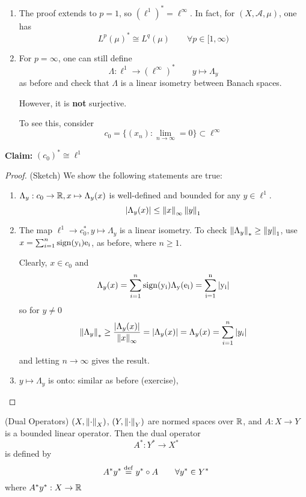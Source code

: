 \documentclass{article}
\begin{document}
\begin{remark}
    \begin{enumerate}[1)]
        \item The proof extends to $p=1$, so $(\ell^1)^* = \ell^{\infty}$. In fact, for $(X, \mathcal{A}, \mu)$, one has  
        $$L^p(\mu)^* \cong L^q(\mu) \qquad \forall p \in [1, \infty)$$
        \item For $p=\infty$, one can still define  
        $$\Lambda: \ell^1 \to (\ell^{\infty})^* \qquad y \mapsto \Lambda_y$$
        as before and check that $\Lambda$ is a linear isometry between Banach spaces.
        
        However, it is \textbf{not} surjective.  
        
        To see this, consider 
        $$c_0 = \{(x_n): \lim_{n \to \infty} = 0\} \subset \ell^{\infty}$$
    \end{enumerate}

\textbf{Claim:} \((c_0)^* \cong \ell^1\ \)
\begin{proof}
    (Sketch) We show the following statements are true:
    \begin{enumerate}[1)]
        \item \(\Lambda_y: c_0 \to \mathbb{R}, x \mapsto \Lambda_y(x)\) is well-defined and bounded for any 
        $y \in \ell^1$.  
        \[|\Lambda_y(x)| \leq \left\|{x}\right\|_{\infty} \left\|{y}\right\|_1\]

        \item The map \( \ell^1 \to c_0^*, y \mapsto \Lambda_y\) is a linear isometry. To check 
        \(\left\|{\Lambda_y}\right\|_* \geq \left\|{y}\right\|_1\), use \(x = \sum_{i=1}^n \rm{sign}(y_i)e_i\), as before, where
        \(n \geq 1\).  

        Clearly, \(x \in c_0\) and  
        \[\Lambda_y(x) = \sum_{i=1}^n \rm{sign}(y_i) \Lambda_y(e_i)=\sum_{i=1}^n |y_i|\]
        so for \(y \neq 0\)  
        \[\left\|{\Lambda_y}\right\|_* \geq \frac{|\Lambda_y(x)|}{\left\|{x}\right\|_{\infty}}=|\Lambda_y(x)|=\Lambda_y(x)=\sum_{i=1}^n |y_i|\]

        and letting \(n \to \infty\) gives the result.  

        \item \(y \mapsto \Lambda_y\) is onto: similar as before (exercise),
    \end{enumerate}
\end{proof}
\end{remark}  

\begin{definition}
    (Dual Operators) 
    \((X, \left\|{\cdot}\right\|_X)\), \((Y, \left\|{\cdot}\right\|_Y)\) are normed spaces over \(\mathbb{R}\), and \(A: X \to Y\) is a bounded linear operator.  
    Then the dual operator 
    \[A^*: Y^* \to X^*\]
    is defined by  
    \[A^* y^* \overset{\rm{def}}{=} y^* \circ A \qquad \forall y^* \in Y^* \]
    where \(A^* y^* : X \to \mathbb{R}\)
\end{definition}  
\end{document}
